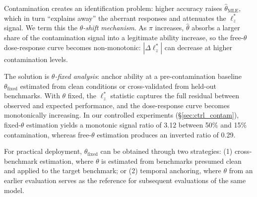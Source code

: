 Contamination creates an identification problem: higher accuracy raises $\hat{\theta}_{\text{MLE}}$, which in turn ``explains away'' the aberrant responses and attenuates the $\ell_z^*$ signal.
We term this the \emph{$\theta$-shift mechanism}.
As $\pi$ increases, $\hat{\theta}$ absorbs a larger share of the contamination signal into a legitimate ability increase, so the free-$\theta$ dose-response curve becomes non-monotonic: $|\Delta\ell_z^*|$ can decrease at higher contamination levels.

The solution is \emph{$\theta$-fixed analysis}: anchor ability at a pre-contamination baseline $\theta_{\text{fixed}}$ estimated from clean conditions or cross-validated from held-out benchmarks.
With $\theta$ fixed, the $\ell_z^*$ statistic captures the full residual between observed and expected performance, and the dose-response curve becomes monotonically increasing.
In our controlled experiments (\S\ref{sec:ctrl_contam}), fixed-$\theta$ estimation yields a monotonic signal ratio of 3.12 between 50\% and 15\% contamination, whereas free-$\theta$ estimation produces an inverted ratio of 0.29.

For practical deployment, $\theta_{\text{fixed}}$ can be obtained through two strategies: (1) cross-benchmark estimation, where $\theta$ is estimated from benchmarks presumed clean and applied to the target benchmark; or (2) temporal anchoring, where $\theta$ from an earlier evaluation serves as the reference for subsequent evaluations of the same model.